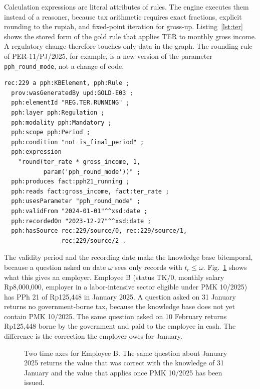Calculation expressions are literal attributes of rules. The engine executes them instead of a reasoner, because tax arithmetic requires exact fractions, explicit rounding to the rupiah, and fixed-point iteration for gross-up. Listing~\ref{lst:ter} shows the stored form of the gold rule that applies TER to monthly gross income. A regulatory change therefore touches only data in the graph. The rounding rule of PER-11/PJ/2025, for example, is a new version of the parameter \texttt{pph\_round\_mode}, not a change of code.

\begin{listing}[!t]
\caption{The gold rule that applies TER to monthly gross income, as stored in the knowledge graph (prefixes shortened).}
\label{lst:ter}
\centering
\begin{minipage}{0.97\columnwidth}
\scriptsize
\begin{verbatim}
rec:229 a pph:KBElement, pph:Rule ;
  prov:wasGeneratedBy upd:GOLD-E03 ;
  pph:elementId "REG.TER.RUNNING" ;
  pph:layer pph:Regulation ;
  pph:modality pph:Mandatory ;
  pph:scope pph:Period ;
  pph:condition "not is_final_period" ;
  pph:expression
    "round(ter_rate * gross_income, 1,
           param('pph_round_mode'))" ;
  pph:produces fact:pph21_running ;
  pph:reads fact:gross_income, fact:ter_rate ;
  pph:usesParameter "pph_round_mode" ;
  pph:validFrom "2024-01-01"^^xsd:date ;
  pph:recordedOn "2023-12-27"^^xsd:date ;
  pph:hasSource rec:229/source/0, rec:229/source/1,
                rec:229/source/2 .
\end{verbatim}
\end{minipage}
\end{listing}

The validity period and the recording date make the knowledge base bitemporal, because a question asked on date $\omega$ sees only records with $t_c \leq \omega$. Fig.~\ref{fig:bitemporal} shows what this gives an employer. Employee B (status TK/0, monthly salary Rp8,000,000, employer in a labor-intensive sector eligible under PMK 10/2025) has PPh 21 of Rp125,448 in January 2025. A question asked on 31 January returns no government-borne tax, because the knowledge base does not yet contain PMK 10/2025. The same question asked on 10 February returns Rp125,448 borne by the government and paid to the employee in cash. The difference is the correction the employer owes for January.

\begin{figure}[!t]
\centering
\figBitemporal
\caption{Two time axes for Employee B. The same question about January 2025 returns the value that was correct with the knowledge of 31 January and the value that applies once PMK 10/2025 has been issued.}
\label{fig:bitemporal}
\end{figure}

